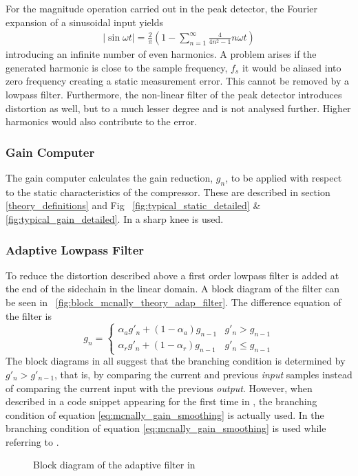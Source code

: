 \documentclass[../main2.tex]{subfiles}
\providecommand{\rootdir}{..}
\begin{document}
For the magnitude operation carried out in the peak detector, the Fourier expansion of a sinusoidal input yields
\begin{align}
\left |\sin{\omega t}\right | = \frac{2}{\pi}\left (1 - \sum_{n=1}^{\infty}\frac{4}{4n^2-1} n\omega t \right) 
\end{align}
introducing an infinite number of even harmonics. A problem arises if the generated harmonic is close to the sample frequency, $f_s$ it would be aliased into zero frequency creating a static measurement error. This cannot be removed by a lowpass filter. Furthermore, the non-linear filter of the peak detector introduces distortion as well, but to a much lesser degree\cite{mcnally1984dynamic} and is not analysed further. Higher harmonics would also contribute to the error. 
\subsubsection{Gain Computer}
The gain computer calculates the gain reduction, $g_n$, to be applied with respect to the static characteristics of the compressor. These are described in section \ref{theory_definitions} and Fig ~\ref{fig:typical_static_detailed} \& \ref{fig:typical_gain_detailed}. In \cite{mcnally1984dynamic} a sharp knee is used.
\subsubsection{Adaptive Lowpass Filter}
To reduce the distortion described above a first order lowpass filter is added at the end of the sidechain in the linear domain. A block diagram of the filter can be seen in ~\ref{fig:block_mcnally_theory_adap_filter}. The difference equation of the filter is
\begin{equation}
g_n = \begin{cases}
    \alpha_{a} g'_n + (1-\alpha_{a}) g_{n-1} 	& g'_n > g_{n-1} \\
    \alpha_{r} g'_n + (1-\alpha_{r}) g_{n-1} 	& g'_n \leq g_{n-1}
\end{cases}
\label{eq:mcnally_gain_smoothing}
\end{equation}
The block diagrams in \cite{mcnally1984dynamic}\cite{dafx02}\cite{dagx11}\cite{zolzer1997digital}\cite{zolzer1997digital}\cite{zolzer2008digital} all suggest that the branching condition is determined by $g'_n > g'_{n-1}$, that is, by comparing the current and previous \emph{input} samples instead of comparing the current input with the previous \emph{output}. However, when described in a code snippet appearing for the first time in \cite{dafx11}, the branching condition of equation \eqref{eq:mcnally_gain_smoothing} is actually used. In \cite{bitzer2006parameter} the branching condition of equation \eqref{eq:mcnally_gain_smoothing} is used while referring to \cite{mcnally1984dynamic}\cite{dafx02}.
\begin{figure}
\centerline{}
\caption{Block diagram of the adaptive filter in \cite{mcnally1984dynamic}}
\label{fig:block_mcnally_theory_rms}
\end{figure}
\end{document}
